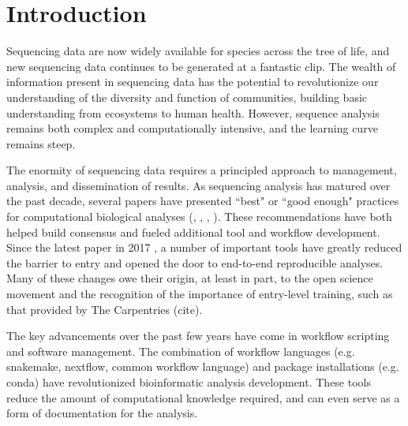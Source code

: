 \documentclass[10pt,letterpaper]{article}
\begin{document}
\linenumbers

\section*{Introduction}

Sequencing data are now widely available for species across the tree of life, and new sequencing data continues to be generated at a fantastic clip. %
The wealth of information present in sequencing data has the potential to revolutionize our understanding of the diversity and function of communities, building basic understanding from ecosystems to human health.
However, sequence analysis remains both complex and computationally intensive, and the learning curve remains steep.

The enormity of sequencing data requires a principled approach to management, analysis, and dissemination of results.
As sequencing analysis has matured over the past decade, several papers have presented ``best" or ``good enough" practices for computational biological analyses (\cite{aruliah2012best}, \cite{wilson2014best}, \cite{shade2015roadmap}, \cite{wilson2017good}).
These recommendations have both helped build consensus and fueled additional tool and workflow development.
Since the latest paper in 2017 \cite{wilson2017good}, a number of important tools have greatly reduced the barrier to entry and opened the door to end-to-end reproducible analyses. %
Many of these changes owe their origin, at least in part, to the open science movement and the recognition of the importance of entry-level training, such as that provided by The Carpentries (cite).

The key advancements over the past few years have come in workflow scripting and software management. %
The combination of workflow languages (e.g. snakemake, nextflow, common workflow language) and package installations (e.g. conda) have revolutionized bioinformatic analysis development.
These tools reduce the amount of computational knowledge required, and can even serve as a form of documentation for the analysis.
\end{document}
